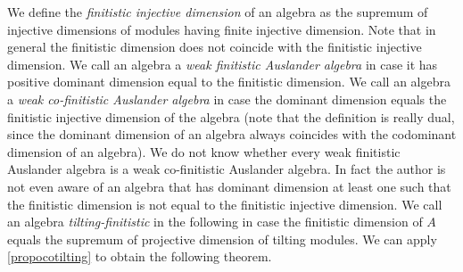 \documentclass[a4paper]{amsart}
\theoremstyle{definition}
\theoremstyle{remark}
\numberwithin{equation}{theorem}
\begin{document}
We define the \emph{finitistic injective dimension} of an algebra as the supremum of injective dimensions of modules having finite injective dimension. Note that in general the finitistic dimension does not coincide with the finitistic injective dimension. We call an algebra a \emph{weak finitistic Auslander algebra} in case it has positive dominant dimension equal to the finitistic dimension. We call an algebra a \emph{weak co-finitistic Auslander algebra} in case the dominant dimension equals the finitistic injective dimension of the algebra (note that the definition is really dual, since the dominant dimension of an algebra always coincides with the codominant dimension of an algebra).
We do not know whether every weak finitistic Auslander algebra is a weak co-finitistic Auslander algebra. In fact the author is not even aware of an algebra that has dominant dimension at least one such that the finitistic dimension is not equal to the finitistic injective dimension.
We call an algebra \emph{tilting-finitistic} in the following in case the finitistic dimension of $A$ equals the supremum of projective dimension of tilting modules. We can apply \ref{propocotilting} to obtain the following theorem.
\end{document}
